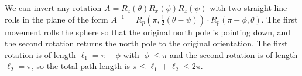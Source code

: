 \documentclass[letter paper, 10pt, conference]{ieeeconf}
\providecommand{\abs}[1]{\lvert#1\rvert}
\begin{document}
  We can invert any rotation $A = R_z(\theta)R_x(\phi)R_z(\psi)$ with two straight line rolls in the plane of the form $A^{-1} = R_{p}(\pi,\tfrac{1}{2}(\theta-\psi)) \cdot R_{p}(\pi-\phi,\theta)$.  The first movement rolls the sphere so that the original north pole is pointing down, and the second rotation returns the north pole to the original orientation.
The first rotation is of length $\ell_1 = \pi - \phi$ with $\abs{\phi} \le \pi$ and the second rotation is of length $\ell_2 =\pi$, so the total path length is  $ \pi \le \ell_1+\ell_2 \le 2\pi$.
\end{document}
